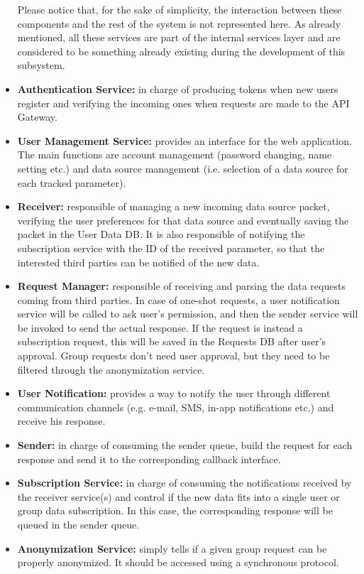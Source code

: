 \begin{itemize}
	Please notice that, for the sake of simplicity, the interaction between these components and the rest of the system is not represented here. As already mentioned, all these services are part of the internal services layer and are considered to be something already existing during the development of this subsystem.
	\item \textbf{Authentication Service:} in charge of producing tokens when new users register and verifying the incoming ones when requests are made to the API Gateway.
	\item \textbf{User Management Service:} provides an interface for the web application. The main functions are account management (password changing, name setting etc.) and data source management (i.e. selection of a data source for each tracked parameter).
	\item \textbf{Receiver:} responsible of managing a new incoming data source packet, verifying the user preferences for that data source and eventually saving the packet in the User Data DB. It is also responsible of notifying the subscription service with the ID of the received parameter, so that the interested third parties can be notified of the new data.
	\item \textbf{Request Manager:} responsible of receiving and parsing the data requests coming from third parties.
	In case of one-shot requests, a user notification service will be called to ask user's permission, and then the sender service will be invoked to send the actual response.
	If the request is instead a subscription request, this will be saved in the Requests DB after user's approval.
	Group requests don't need user approval, but they need to be filtered through the anonymization service.
	\item \textbf{User Notification:} provides a way to notify the user through different communication channels (e.g. e-mail, SMS, in-app notifications etc.) and receive his response.
	\item \textbf{Sender:} in charge of consuming the sender queue, build the request for each response and send it to the corresponding callback interface.
	\item \textbf{Subscription Service:} in charge of consuming the notifications received by the receiver service(s) and control if the new data fits into a single user or group data subscription. In this case, the corresponding response will be queued in the sender queue.
	\item \textbf{Anonymization Service:} simply tells if a given group request can be properly anonymized. It should be accessed using a synchronous protocol.
\end{itemize}

